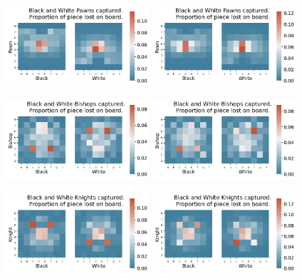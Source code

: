\documentclass[11pt]{article}
\begin{document}
\begin{center}
\includegraphics[width=0.4\textwidth]{Images/_HEATMAP_Pawn_FISC.png}
\includegraphics[width=0.4\textwidth]{Images/_HEATMAP_Pawn_TOURNEMENTS.png}
\end{center}
\begin{center}
\includegraphics[width=0.4\textwidth]{Images/_HEATMAP_Bishop_FISC.png}
\includegraphics[width=0.4\textwidth]{Images/_HEATMAP_Bishop_TOURNEMENTS.png}
\end{center}
\begin{center}
\includegraphics[width=0.4\textwidth]{Images/_HEATMAP_Knight_FISC.png}
\includegraphics[width=0.4\textwidth]{Images/_HEATMAP_Knight_TOURNEMENTS.png}
\end{center}
\end{document}
